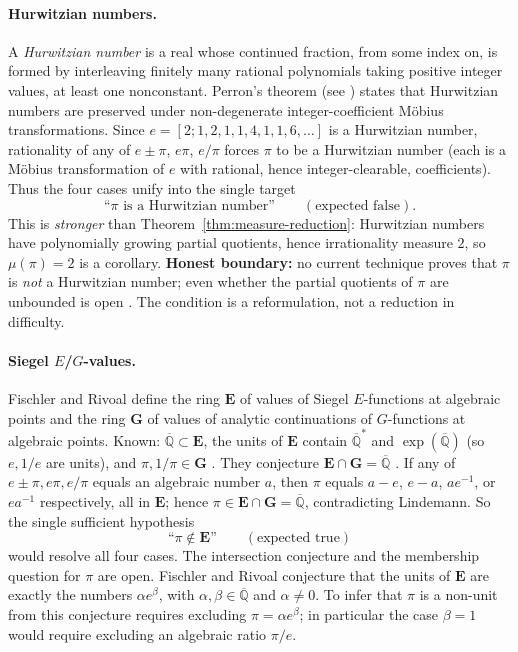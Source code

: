 \documentclass[11pt]{amsart}
\theoremstyle{definition}
\theoremstyle{remark}
\numberwithin{equation}{section}
\newcommand{\Q}{\mathbb{Q}}
\newcommand{\Qbar}{\overline{\mathbb{Q}}}
\newcommand{\irr}{\mu}
\newcommand{\ee}{e}
\begin{document}
\paragraph{Hurwitzian numbers.} A \emph{Hurwitzian number} is a real whose continued fraction, from some index on, is formed by interleaving finitely many rational polynomials taking positive integer values, at least one nonconstant. Perron's theorem (see \cite[p.~141]{Stambul}) states that Hurwitzian numbers are preserved under non-degenerate integer-coefficient M\"obius transformations. Since $\ee=[2;1,2,1,1,4,1,1,6,\dots]$ is a Hurwitzian number, rationality of any of $e\pm\pi$, $e\pi$, $e/\pi$ forces $\pi$ to be a Hurwitzian number (each is a M\"obius transformation of $e$ with rational, hence integer-clearable, coefficients). Thus the four cases unify into the single target
\[
\text{``$\pi$ is a Hurwitzian number''}\qquad(\text{expected false}).
\]
This is \emph{stronger} than Theorem~\ref{thm:measure-reduction}: Hurwitzian numbers have polynomially growing partial quotients, hence irrationality measure $2$, so $\irr(\pi)=2$ is a corollary. \textbf{Honest boundary:} no current technique proves that $\pi$ is \emph{not} a Hurwitzian number; even whether the partial quotients of $\pi$ are unbounded is open \cite{Hildebrand2024}. The condition is a reformulation, not a reduction in difficulty.

\paragraph{Siegel \texorpdfstring{$E$}{E}/$G$-values.} Fischler and Rivoal \cite{FischlerRivoal2016} define the ring $\mathbf{E}$ of values of Siegel $E$-functions at algebraic points and the ring $\mathbf{G}$ of values of analytic continuations of $G$-functions at algebraic points. Known: $\overline{\Q}\subset\mathbf{E}$, the units of $\mathbf{E}$ contain $\overline{\Q}^*$ and $\exp(\overline{\Q})$ (so $e,1/e$ are units), and $\pi,1/\pi\in\mathbf{G}$ \cite{FischlerRivoal2014}. They conjecture $\mathbf{E}\cap\mathbf{G}=\overline{\Q}$ \cite{FischlerRivoal2024}. If any of $e\pm\pi,e\pi,e/\pi$ equals an algebraic number $a$, then $\pi$ equals $a-e$, $e-a$, $ae^{-1}$, or $ea^{-1}$ respectively, all in $\mathbf{E}$; hence $\pi\in\mathbf{E}\cap\mathbf{G}=\overline{\Q}$, contradicting Lindemann. So the single sufficient hypothesis
\[
\text{``$\pi\notin\mathbf{E}$''}\qquad(\text{expected true})
\]
would resolve all four cases.
The intersection conjecture and the membership question for $\pi$ are
open. Fischler and Rivoal \cite[Conjecture~1.2]{FischlerRivoal2026}
conjecture that the units of $\mathbf E$ are exactly the numbers
$\alpha e^\beta$, with $\alpha,\beta\in\Qbar$ and $\alpha\ne0$.
To infer that $\pi$ is a non-unit from this conjecture requires excluding
$\pi=\alpha e^\beta$; in particular the case $\beta=1$ would require
excluding an algebraic ratio $\pi/e$.
\end{document}

